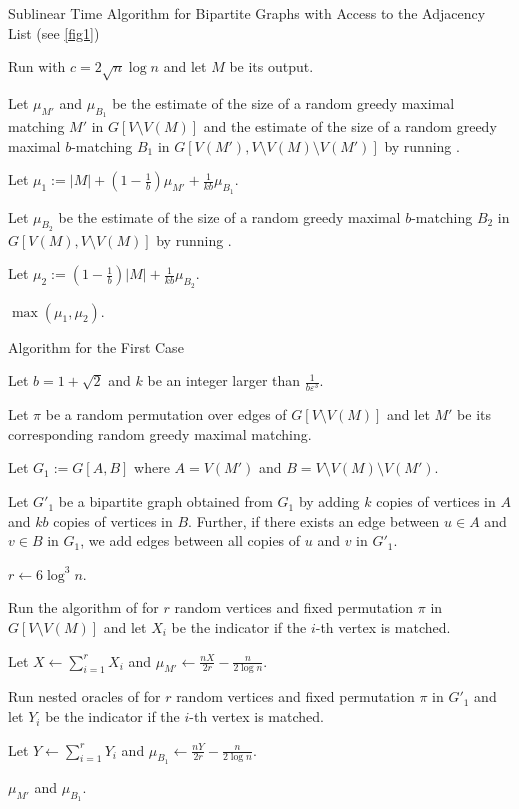 \documentclass[letterpaper,11pt]{article}
\renewcommand{\epsilon}{\varepsilon}
\begin{document}
\begin{algorithm}[H]
\caption{Sublinear Time Algorithm for Bipartite Graphs with Access to the Adjacency List (see \cref{fig1})}
\label{alg:sublinear-first}

Run  with $c = 2\sqrt{n} \log n$ and let $M$ be its output.

Let $\mu_{M'}$ and $\mu_{B_1}$ be the estimate of the size of a random greedy maximal matching $M'$ in $G[V \setminus V(M)]$ and the estimate of the size of a random greedy maximal $b$-matching $B_1$ in $G[V(M'), V \setminus V(M) \setminus V(M')]$ by running . 

Let $\mu_1 := |M| + (1 - \frac{1}{b}) \mu_{M'} + \frac{1}{kb} \mu_{B_1}$. 

Let $\mu_{B_2}$ be the estimate of the size of a random greedy maximal $b$-matching $B_2$ in $G[V(M), V \setminus V(M)]$ by running . 

Let $\mu_2 := (1 - \frac{1}{b}) |M| + \frac{1}{kb} \mu_{B_2}$. 

\Return $\max (\mu_1, \mu_2)$.

\end{algorithm}


\begin{algorithm}[H]
\caption{Algorithm for the First Case}
\label{alg:first-case}
Let $b = 1 + \sqrt{2}$ and $k$ be an integer larger than $\frac{1}{b\epsilon^3}$.



Let $\pi$ be a random permutation over edges of $G[V \setminus V(M)]$ and let $M'$ be its corresponding random greedy maximal matching.


Let $G_1 := G[A,B]$ where $A = V(M')$ and $B = V \setminus V(M) \setminus V(M')$. 

Let $G'_1$ be a bipartite graph obtained from $G_1$ by adding $k$ copies of vertices in $A$ and $kb$ copies of vertices in $B$. Further, if there exists an edge between $u \in A$ and $v \in B$ in $G_1$, we add edges between all copies of $u$ and $v$ in $G'_1$.


$r \gets 6 \log^3 n$.

Run the algorithm of  for $r$ random vertices and fixed permutation $\pi$ in $G[V \setminus V(M)]$ and let $X_i$ be the indicator if the $i$-th vertex is matched.





Let $X \gets \sum_{i=1}^r X_i$ and $\mu_{M'} \gets \frac{nX}{2r} - \frac{n}{2\log n}$.




Run nested oracles of  for $r$ random vertices and fixed permutation $\pi$ in $G'_1$ and let $Y_i$ be the indicator if the $i$-th vertex is matched.


Let $Y \gets \sum_{i=1}^r Y_i$ and $\mu_{B_1} \gets \frac{nY}{2r} - \frac{n}{2\log n}$.


\Return $\mu_{M'}$ and $\mu_{B_1}$.



    
\end{algorithm}
\end{document}
